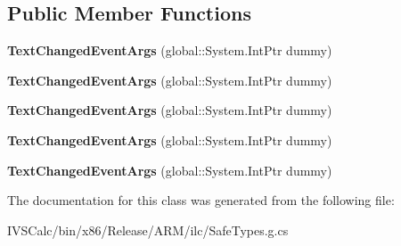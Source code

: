 \subsection*{Public Member Functions}
\begin{DoxyCompactItemize}
\item 
\mbox{\label{class_windows_1_1_u_i_1_1_xaml_1_1_controls_1_1_text_changed_event_args_a312d1d7c540598ecdc3f1bc91531f008}} 
{\bfseries Text\+Changed\+Event\+Args} (global\+::\+System.\+Int\+Ptr dummy)
\item 
\mbox{\label{class_windows_1_1_u_i_1_1_xaml_1_1_controls_1_1_text_changed_event_args_a312d1d7c540598ecdc3f1bc91531f008}} 
{\bfseries Text\+Changed\+Event\+Args} (global\+::\+System.\+Int\+Ptr dummy)
\item 
\mbox{\label{class_windows_1_1_u_i_1_1_xaml_1_1_controls_1_1_text_changed_event_args_a312d1d7c540598ecdc3f1bc91531f008}} 
{\bfseries Text\+Changed\+Event\+Args} (global\+::\+System.\+Int\+Ptr dummy)
\item 
\mbox{\label{class_windows_1_1_u_i_1_1_xaml_1_1_controls_1_1_text_changed_event_args_a312d1d7c540598ecdc3f1bc91531f008}} 
{\bfseries Text\+Changed\+Event\+Args} (global\+::\+System.\+Int\+Ptr dummy)
\item 
\mbox{\label{class_windows_1_1_u_i_1_1_xaml_1_1_controls_1_1_text_changed_event_args_a312d1d7c540598ecdc3f1bc91531f008}} 
{\bfseries Text\+Changed\+Event\+Args} (global\+::\+System.\+Int\+Ptr dummy)
\end{DoxyCompactItemize}


The documentation for this class was generated from the following file\+:\begin{DoxyCompactItemize}
\item 
I\+V\+S\+Calc/bin/x86/\+Release/\+A\+R\+M/ilc/Safe\+Types.\+g.\+cs\end{DoxyCompactItemize}
